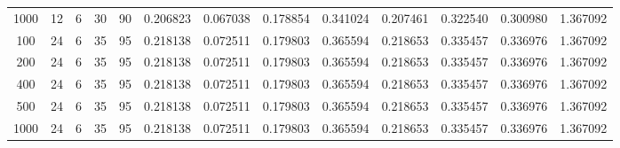 \begin{table}[h]
\begin{tabular}{ccccccccccccc}
1000 & 12 & 6 & 30 & 90 & 0.206823 & 0.067038 & 0.178854 & 0.341024 & 0.207461 & 0.322540 & 0.300980 & 1.367092 \\
100 & 24 & 6 & 35 & 95 & 0.218138 & 0.072511 & 0.179803 & 0.365594 & 0.218653 & 0.335457 & 0.336976 & 1.367092 \\
200 & 24 & 6 & 35 & 95 & 0.218138 & 0.072511 & 0.179803 & 0.365594 & 0.218653 & 0.335457 & 0.336976 & 1.367092 \\
400 & 24 & 6 & 35 & 95 & 0.218138 & 0.072511 & 0.179803 & 0.365594 & 0.218653 & 0.335457 & 0.336976 & 1.367092 \\
500 & 24 & 6 & 35 & 95 & 0.218138 & 0.072511 & 0.179803 & 0.365594 & 0.218653 & 0.335457 & 0.336976 & 1.367092 \\
1000 & 24 & 6 & 35 & 95 & 0.218138 & 0.072511 & 0.179803 & 0.365594 & 0.218653 & 0.335457 & 0.336976 & 1.367092 \\
\bottomrule
\end{tabular}
\end{table}
